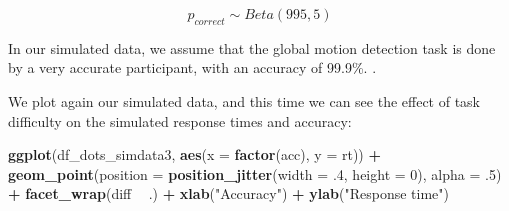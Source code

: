 \documentclass[12pt,]{krantz}
\newenvironment{Shaded}{\begin{snugshade}}{\end{snugshade}}
\newcommand{\DataTypeTok}[1]{\textcolor[rgb]{0.13,0.29,0.53}{#1}}
\newcommand{\DecValTok}[1]{\textcolor[rgb]{0.00,0.00,0.81}{#1}}
\newcommand{\FloatTok}[1]{\textcolor[rgb]{0.00,0.00,0.81}{#1}}
\newcommand{\KeywordTok}[1]{\textcolor[rgb]{0.13,0.29,0.53}{\textbf{#1}}}
\newcommand{\NormalTok}[1]{#1}
\newcommand{\OperatorTok}[1]{\textcolor[rgb]{0.81,0.36,0.00}{\textbf{#1}}}
\newcommand{\StringTok}[1]{\textcolor[rgb]{0.31,0.60,0.02}{#1}}
\theoremstyle{definition}
\theoremstyle{definition}
\theoremstyle{definition}
\theoremstyle{remark}
\begin{document}
\begin{equation}
p_{correct} \sim Beta(995, 5)
\end{equation}

In our simulated data, we assume that the global motion detection task is done by a very accurate participant, with an accuracy of 99.9\%. .

\begin{Shaded}
\end{Shaded}

We plot again our simulated data, and this time we can see the effect of task difficulty on the simulated response times and accuracy:

\begin{Shaded}
\begin{Highlighting}[]
\KeywordTok{ggplot}\NormalTok{(df_dots_simdata3, }\KeywordTok{aes}\NormalTok{(}\DataTypeTok{x =} \KeywordTok{factor}\NormalTok{(acc), }\DataTypeTok{y =}\NormalTok{ rt)) }\OperatorTok{+}
\StringTok{  }\KeywordTok{geom_point}\NormalTok{(}\DataTypeTok{position =} \KeywordTok{position_jitter}\NormalTok{(}\DataTypeTok{width =} \FloatTok{.4}\NormalTok{, }\DataTypeTok{height =} \DecValTok{0}\NormalTok{),}
             \DataTypeTok{alpha =} \FloatTok{.5}\NormalTok{) }\OperatorTok{+}
\StringTok{  }\KeywordTok{facet_wrap}\NormalTok{(diff }\OperatorTok{~}\StringTok{ }\NormalTok{.) }\OperatorTok{+}
\StringTok{  }\KeywordTok{xlab}\NormalTok{(}\StringTok{"Accuracy"}\NormalTok{) }\OperatorTok{+}
\StringTok{  }\KeywordTok{ylab}\NormalTok{(}\StringTok{"Response time"}\NormalTok{)}
\end{Highlighting}
\end{Shaded}
\end{document}
